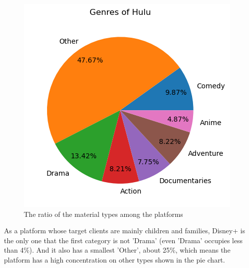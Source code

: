 \documentclass{article}
\begin{document}
\begin{figure}[!htb]
{\begin{minipage}[t]{0.45\linewidth}
			\centering
			\includegraphics[scale=0.5]{../genres/Hulu_genres.png}
		\end{minipage}
	}
	\caption{The ratio of the material types among the platforms}
	\label{fig:genres}
\end{figure}

As a platform whose target clients are mainly children and 
families, Disney+ is the only one that the first category is not 'Drama' 
(even 'Drama' occupies less than 4\%). And it also has a smallest 'Other', 
about 25\%, which means the platform has a high concentration on other types 
shown in the pie chart.
\end{document}
